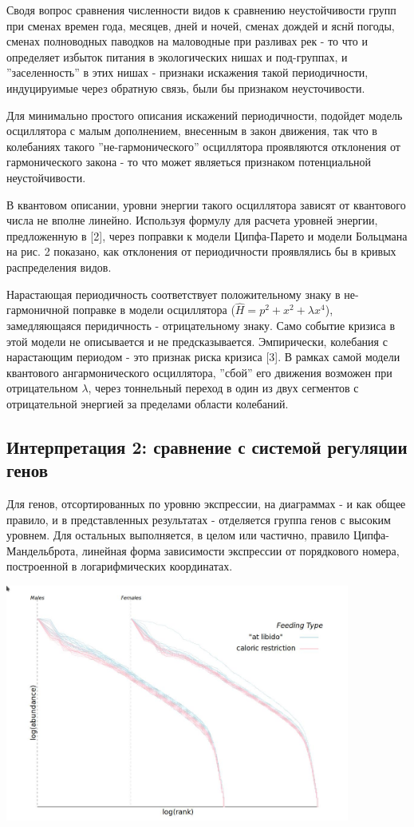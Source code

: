 \documentclass[a4paper]{article}
\begin{document}
Сводя вопрос сравнения численности видов к сравнению неустойчивости групп при сменах времен года, месяцев, дней и ночей, сменах дождей и яснй погоды, сменах полноводных паводков на маловодные при разливах рек - то что и определяет избыток питания в экологических нишах и под-группах, и ''заселенность'' в этих нишах - признаки искажения такой периодичности, индуцируимые через обратную связь, были бы признаком неусточивости.

Для минимально простого описания искажений периодичности, подойдет модель осциллятора с малым дополнением, внесенным в закон движения, так что в колебаниях такого ''не-гармонического'' осциллятора проявляются отклонения от гармонического закона - то что может являеться признаком потенциальной неустойчивости.

В квантовом описании, уровни энергии такого осциллятора зависят от квантового числа не вполне линейно. Используя формулу для расчета уровней энергии, предложенную в [2], через поправки к модели Ципфа-Парето и модели Больцмана на рис. 2 показано, как отклонения от периодичности проявлялись бы в кривых распределения видов.

Нарастающая периодичность соответствует положительному знаку в не-гармоничной поправке в модели осциллятора ($\hat H = p^2 + x^2 + \lambda x^4$), замедляющаяся перидичность - отрицательному знаку. Само событие кризиса в этой модели не описывается и не предсказывается. Эмпирически, колебания с нарастающим периодом - это признак риска кризиса [3]. В рамках самой модели квантового ангармонического осциллятора, ''сбой'' его движения возможен при отрицательном $\lambda$, через тоннельный переход в один из двух сегментов с отрицательной энергией за пределами области колебаний.

\subsection*{Интерпретация 2: сравнение с системой регуляции генов}

Для генов, отсортированных по уровню экспрессии, на диаграммах - и как общее правило, и в представленных результатах - отделяется группа генов с высоким уровнем. Для остальных выполняется, в целом или частично, правило Ципфа-Мандельброта, линейная форма зависимости экспрессии от порядкового номера, построенной в логарифмических координатах.

\includegraphics[width=0.85\textwidth]{rankabundance_rnaseq.jpg}
\end{document}

